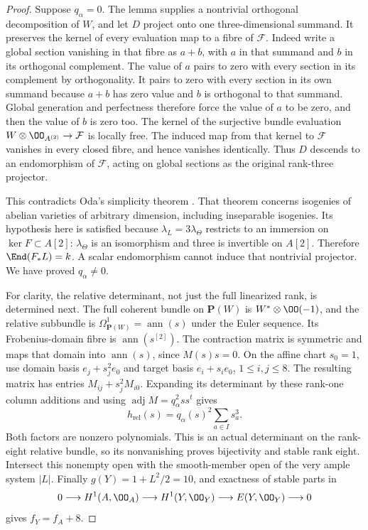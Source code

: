 \begin{proof}
Suppose $q_\alpha=0$.  The lemma supplies a nontrivial orthogonal
decomposition of $W$, and let $D$ project onto one three-dimensional
summand.  It preserves the kernel of every evaluation map to a fibre
of $\mathcal F$.  Indeed write a global section vanishing in that fibre
as $a+b$, with $a$ in that summand and $b$ in its orthogonal complement.
The value of $a$ pairs to zero with every section in its complement
by orthogonality.  It pairs to zero with every section in its own
summand because $a+b$ has zero value and $b$ is orthogonal to that
summand.  Global generation and perfectness therefore force the value
of $a$ to be zero, and then the value of $b$ is zero too.
The kernel of the surjective bundle evaluation
$W\otimes\OO_{A^{(2)}}\to\mathcal F$ is locally free.  The induced
map from that kernel to $\mathcal F$ vanishes in every closed fibre,
and hence vanishes identically.  Thus $D$ descends to an endomorphism
of $\mathcal F$, acting on global sections as the original rank-three
projector.

This contradicts Oda's simplicity theorem
\cite[Theorem~1.2(i), p.~45, with its preceding proof
pp.~43--45]{Oda1971}.  That theorem concerns isogenies of abelian
varieties of arbitrary dimension, including inseparable isogenies.
Its hypothesis here is satisfied because
$\lambda_L=3\lambda_\Theta$ restricts to an immersion on
$\ker F\subset A[2]$: $\lambda_\Theta$ is an isomorphism and three
is invertible on $A[2]$.  Therefore
$\End(F_*L)=k$.  A scalar endomorphism cannot induce that nontrivial
projector.  We have proved $q_\alpha\ne0$.

For clarity, the relative determinant, not just the full linearized
rank, is determined next.  The full coherent bundle on
$\mathbf P(W)$ is $W^*\otimes\OO(-1)$, and the relative subbundle
is $\Omega^1_{\mathbf P(W)}=\operatorname{ann}(s)$ under the Euler
sequence.  Its Frobenius-domain fibre is
$\operatorname{ann}(s^{[2]})$.  The contraction matrix is symmetric
and maps that domain into $\operatorname{ann}(s)$, since $M(s)s=0$.
On the affine chart $s_0=1$, use domain basis
$e_j+s_j^2e_0$ and target basis $e_i+s_ie_0$, $1\le i,j\le8$.
The resulting matrix has entries $M_{ij}+s_j^2M_{i0}$.
Expanding its determinant by these rank-one column additions and
using $\operatorname{adj}M=q_\alpha^2ss^t$ gives
\begin{equation}\label{eq:DE-A3-relative-theta-Hasse}
                 h_{\mathrm{rel}}(s)
                    =q_\alpha(s)^2\sum_{a\in I}s_a^3.
\end{equation}
Both factors are nonzero polynomials.  This is an actual determinant
on the rank-eight relative bundle, so its nonvanishing proves
bijectivity and stable rank eight.  Intersect this nonempty open with
the smooth-member open of the very ample system $|L|$.
Finally $g(Y)=1+L^2/2=10$, and exactness of stable parts in
\[
 0\longrightarrow H^1(A,\OO_A)\longrightarrow H^1(Y,\OO_Y)
   \longrightarrow E(Y,\OO_Y)\longrightarrow0
\]
gives $f_Y=f_A+8$.
\end{proof}

